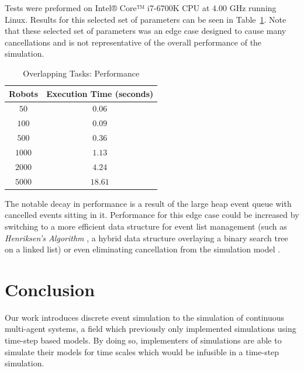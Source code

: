 \documentclass[conference,letterpaper]{IEEEtran}
\begin{document}
Tests were preformed on Intel® Core™ i7-6700K CPU at $4.00$ GHz running Linux.
Results for this selected set of parameters can be seen in
Table~\ref{tbl:times}. Note that these selected set of parameters was an edge
case designed to cause many cancellations and is not representative of the
overall performance of the simulation.

\begin{table}[hb]
    \caption{Overlapping Tasks: Performance}
    \label{tbl:times}
    \begin{center}
    \begin{tabular}{| c | c |}
        \hline
        \textbf{Robots} & \textbf{Execution Time} (seconds) \\
        \hline
        $50$ & $0.06$ \\
        \hline
        $100$ & $0.09$ \\
        \hline
        $500$ & $0.36$ \\
        \hline
        $1000$ & $1.13$ \\
        \hline
        $2000$ & $4.24$ \\
        \hline
        $5000$ & $18.61$ \\
        \hline
    \end{tabular}
    \end{center}
\end{table}

The notable decay in performance is a result of the large heap event queue with
cancelled events sitting in it. Performance for this edge case could be
increased by switching to a more efficient data structure for event list
management (such as \emph{Henriksen's Algorithm} \cite{henriksen}, a hybrid
data structure overlaying a binary search tree on a linked list) or even
eliminating cancellation from the simulation model \cite{elimcancel1}.

\section{Conclusion}
\label{sec:conclusion}

Our work introduces discrete event simulation to the simulation of
continuous multi-agent systems, a field which previously only implemented
simulations using time-step based models. By doing so, implementers of
simulations are able to simulate their models for time scales which would be
infusible in a time-step simulation.
\end{document}
